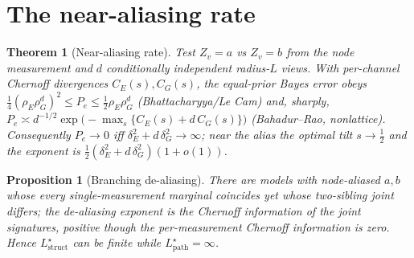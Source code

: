 \documentclass[11pt]{article}
\theoremstyle{plain}
\newtheorem{theorem}{Theorem}\newtheorem{proposition}{Proposition}\newtheorem{corollary}{Corollary}
\theoremstyle{definition}\newtheorem{definition}{Definition}\newtheorem{assumption}{Assumption}
\newcommand{\Lpath}{L^\star_{\mathrm{path}}}\newcommand{\Lstr}{L^\star_{\mathrm{struct}}}
\begin{document}
\section{The near-aliasing rate}\label{sec:rate}
\begin{theorem}[Near-aliasing rate]\label{thm:rate}
Test $Z_v=a$ vs $Z_v=b$ from the node measurement and $d$ conditionally independent radius-$L$ views. With
per-channel Chernoff divergences $C_E(s),C_G(s)$, the equal-prior Bayes error obeys
$\tfrac14(\rho_E\rho_G^d)^2\le P_e\le\tfrac12\rho_E\rho_G^d$ (Bhattacharyya/Le Cam) and, sharply,
$P_e\asymp d^{-1/2}\exp\!\big(-\max_s\{C_E(s)+d\,C_G(s)\}\big)$ (Bahadur--Rao, nonlattice). Consequently
$P_e\to0$ iff $\delta_E^2+d\,\delta_G^2\to\infty$; near the alias the optimal tilt $s\to\tfrac12$ and the exponent
is $\tfrac12(\delta_E^2+d\,\delta_G^2)(1+o(1))$.
\end{theorem}
\begin{proposition}[Branching de-aliasing]\label{prop:branch}
There are models with node-aliased $a,b$ whose every single-measurement marginal coincides yet whose two-sibling
joint differs; the de-aliasing exponent is the Chernoff information of the joint signatures, positive though the
per-measurement Chernoff information is zero. Hence $\Lstr$ can be finite while $\Lpath=\infty$.
\end{proposition}
\end{document}
